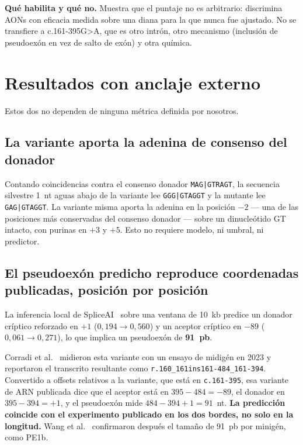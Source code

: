 \documentclass[11pt,a4paper]{article}
\begin{document}
\textbf{Qué habilita y qué no.} Muestra que el puntaje no es arbitrario: discrimina AONs con eficacia
medida sobre una diana para la que nunca fue ajustado. No se transfiere a c.161-395G>A, que es otro
intrón, otro mecanismo (inclusión de pseudoexón en vez de salto de exón) y otra química.

\section{Resultados con anclaje externo}

Estos dos no dependen de ninguna métrica definida por nosotros.

\subsection{La variante aporta la adenina de consenso del donador}

Contando coincidencias contra el consenso donador \texttt{MAG|GTRAGT}, la secuencia silvestre 1~nt
aguas abajo de la variante lee \texttt{GGG|GTAGGT} y la mutante lee \texttt{GAG|GTAGGT}. La variante
misma aporta la adenina en la posición $-2$ --- una de las posiciones más conservadas del consenso
donador --- sobre un dinucleótido GT intacto, con purinas en $+3$ y $+5$. Esto no requiere modelo, ni
umbral, ni predictor.

\subsection{El pseudoexón predicho reproduce coordenadas publicadas, posición por posición}
\label{sec:coordenadas}

La inferencia local de SpliceAI~\cite{jaganathan2019} sobre una ventana de 10~kb predice un donador
críptico reforzado en $+1$ ($0{,}194 \rightarrow 0{,}560$) y un aceptor críptico en $-89$
($0{,}061 \rightarrow 0{,}271$), lo que implica un pseudoexón de \textbf{91~pb}.

Corradi et al.~\cite{corradi2023} midieron esta variante con un ensayo de midigén en 2023 y
reportaron el transcrito resultante como \texttt{r.160\_161ins161-484\_161-394}. Convertido a
offsets relativos a la variante, que está en \texttt{c.161-395}, esa variante de ARN publicada dice
que el aceptor está en $395-484 = -89$, el donador en $395-394 = +1$, y el pseudoexón mide
$484-394+1 = 91$~nt. \textbf{La predicción coincide con el experimento publicado en los dos bordes,
no solo en la longitud.} Wang et al.~\cite{wang2025} confirmaron después el tamaño de 91~pb por
minigén, como PE1b.
\end{document}
